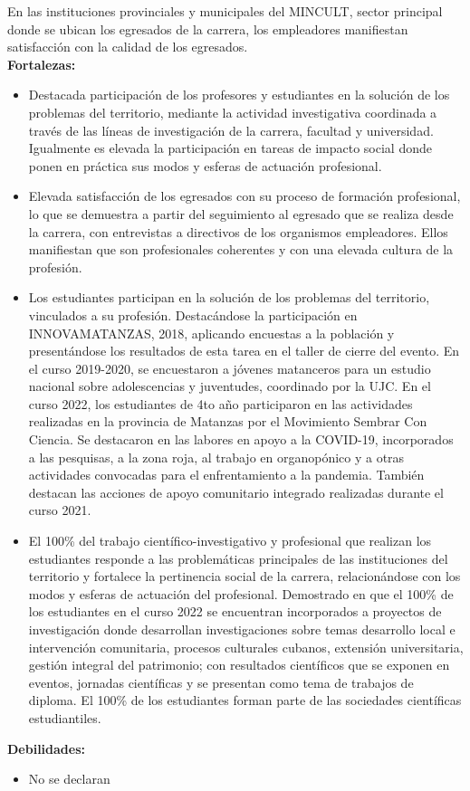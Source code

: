 En las instituciones provinciales y municipales del MINCULT, sector principal donde se ubican los egresados de la carrera, los empleadores manifiestan satisfacción con la calidad de los egresados.\\

\textbf{Fortalezas:}

\begin{itemize}
	\item Destacada participación de los profesores y estudiantes en la solución de los problemas del territorio, mediante la actividad investigativa coordinada a través de las líneas de investigación de la carrera, facultad y universidad. Igualmente es elevada la participación en tareas de impacto social donde ponen en práctica sus modos y esferas de actuación profesional.
	\item Elevada satisfacción de los egresados con su proceso de formación profesional, lo que se demuestra a partir del seguimiento al egresado que se realiza desde la carrera, con entrevistas a directivos de los organismos empleadores. Ellos manifiestan que son profesionales coherentes y con una elevada cultura de la profesión.
	\item Los estudiantes participan en la solución de los problemas del territorio, vinculados a su profesión. Destacándose la participación en INNOVAMATANZAS, 2018, aplicando encuestas a la población y presentándose los resultados de esta tarea en el taller de cierre del evento. En el curso 2019-2020, se encuestaron a jóvenes matanceros para un estudio nacional sobre adolescencias y juventudes, coordinado por la UJC. En el curso 2022, los estudiantes de 4to año participaron en las actividades realizadas en la provincia de Matanzas por el Movimiento Sembrar Con Ciencia. Se destacaron en las labores en apoyo a la COVID-19, incorporados a las pesquisas, a la zona roja, al trabajo en organopónico y a otras actividades convocadas para el enfrentamiento a la pandemia. También destacan las acciones de apoyo comunitario integrado realizadas durante el curso 2021.
	\item El 100\% del trabajo científico-investigativo y profesional que realizan los estudiantes responde a las problemáticas principales de las instituciones del territorio y fortalece la pertinencia social de la carrera, relacionándose con los modos y esferas de actuación del profesional. Demostrado en que el 100\% de los estudiantes en el curso 2022 se encuentran incorporados a proyectos de investigación donde desarrollan investigaciones sobre temas desarrollo local e intervención comunitaria, procesos culturales cubanos, extensión universitaria, gestión integral del patrimonio; con resultados científicos que se exponen en eventos, jornadas científicas y se presentan como tema de trabajos de diploma. El 100\% de los estudiantes forman parte de las sociedades científicas estudiantiles.
\end{itemize}

\textbf{Debilidades:}
\begin{itemize}
	\item No se declaran
\end{itemize}